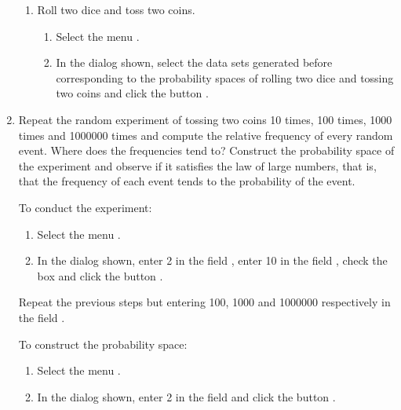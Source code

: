 \begin{enumerate}[leftmargin=*]
\begin{enumerate}
\item Roll two dice and toss two coins. 
\begin{indication}
\begin{enumerate}
\item Select the menu .
\item In the dialog shown, select the data sets generated before corresponding to the probability spaces of rolling two dice and tossing two coins and click the button .
\end{enumerate}
\end{indication}
\end{enumerate}  

\item Repeat the random experiment of tossing two coins 10 times, 100 times, 1000 times and 1000000 times and compute the relative frequency of every random event. 
Where does the frequencies tend to?
Construct the probability space of the experiment and observe if it satisfies the law of large numbers, that is, that the frequency of each event tends to the probability of the event. 
\begin{indication}
To conduct the experiment:
\begin{enumerate}
\item Select the menu .
\item In the dialog shown, enter 2 in the field , enter 10 in the field , check the box  and click the button .
\end{enumerate}
Repeat the previous steps but entering 100, 1000 and 1000000 respectively in the field .

To construct the probability space:
\begin{enumerate}
\item Select the menu .
\item In the dialog shown, enter 2 in the field  and click the button .
\end{enumerate}
\end{indication}


\end{enumerate}
